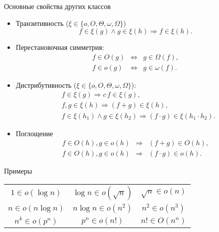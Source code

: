 \documentclass[landscape]{slides}
\begin{document}
\begin{slide}
  Основные свойства других классов
  \begin{itemize}
    \item Транзитивность ($\xi\in\{o,O,\Theta,\omega,\Omega\}$)
      \[
        f\in \xi(g) \land g\in \xi(h) \Rightarrow f\in \xi(h) .
      \]
    \item Перестановочная симметрия:
      \begin{eqnarray*}
        f\in O(g) &\Leftrightarrow& g\in \Omega(f),\\
        f\in o(g) &\Leftrightarrow& g\in \omega(f).
      \end{eqnarray*}
    \item Дистрибутивность ($\xi\in\{o,O,\Theta,\omega,\Omega\}$):
      \begin{eqnarray*}
        &f\in \xi(g) \Rightarrow c\,f\in \xi(g),\\
        &f, g\in\xi(h) \Rightarrow (f+g)\in\xi(h),\\
        &f\in\xi(h_1) \land g\in\xi(h_2) \Rightarrow (f\cdot g)\in\xi(h_1\cdot h_2).
      \end{eqnarray*}
    \item Поглощение
      \begin{eqnarray*}
        f\in O(h), g\in o(h) &\Rightarrow& (f+g)\in O(h),\\
        f\in O(h), g\in o(h) &\Rightarrow& (f\cdot g)\in o(h).
      \end{eqnarray*}
  \end{itemize}
\end{slide}

\begin{slide}
  Примеры
  \begin{center}
    \renewcommand{\arraystretch}{2}
    \begin{tabular}{ccc}
      $1 \in o(\log n)$&
      $\log n\in o(\sqrt{n})$&
      $\sqrt{n}\in o(n)$\\
      $n\in o(n\log n)$&
      $n\log n\in o(n^2)$&
      $n^2\in o(n^3)$\\
      $n^k\in o(p^n)$&
      $p^n\in o(n!)$&
      $n!\in O(n^n)$
    \end{tabular}
  \end{center}
\end{slide}
\end{document}
